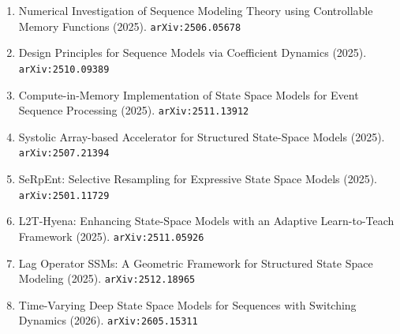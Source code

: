 \documentclass[11pt]{article}
\begin{document}
\begin{enumerate}
  \item Numerical Investigation of Sequence Modeling Theory using Controllable Memory Functions (2025). \texttt{arXiv:2506.05678}
  \item Design Principles for Sequence Models via Coefficient Dynamics (2025). \texttt{arXiv:2510.09389}
  \item Compute-in-Memory Implementation of State Space Models for Event Sequence Processing (2025). \texttt{arXiv:2511.13912}
  \item Systolic Array-based Accelerator for Structured State-Space Models (2025). \texttt{arXiv:2507.21394}
  \item SeRpEnt: Selective Resampling for Expressive State Space Models (2025). \texttt{arXiv:2501.11729}
  \item L2T-Hyena: Enhancing State-Space Models with an Adaptive Learn-to-Teach Framework (2025). \texttt{arXiv:2511.05926}
  \item Lag Operator SSMs: A Geometric Framework for Structured State Space Modeling (2025). \texttt{arXiv:2512.18965}
  \item Time-Varying Deep State Space Models for Sequences with Switching Dynamics (2026). \texttt{arXiv:2605.15311}
\end{enumerate}
\end{document}
